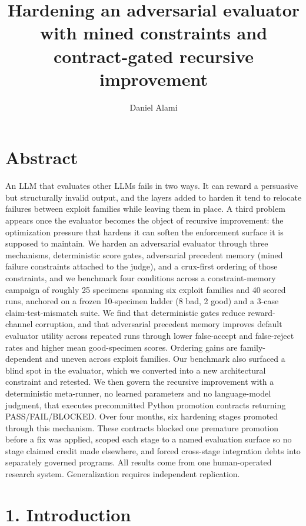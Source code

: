 \documentclass[
  11pt]{article}
\title{Hardening an adversarial evaluator with mined constraints and
contract-gated recursive improvement}
\author{Daniel Alami}
\date{}
\begin{document}
\maketitle

\section{Abstract}\label{abstract}

An LLM that evaluates other LLMs fails in two ways. It can reward a
persuasive but structurally invalid output, and the layers added to
harden it tend to relocate failures between exploit families while
leaving them in place. A third problem appears once the evaluator
becomes the object of recursive improvement: the optimization pressure
that hardens it can soften the enforcement surface it is supposed to
maintain. We harden an adversarial evaluator through three mechanisms,
deterministic score gates, adversarial precedent memory (mined failure
constraints attached to the judge), and a crux-first ordering of those
constraints, and we benchmark four conditions across a constraint-memory
campaign of roughly 25 specimens spanning six exploit families and 40
scored runs, anchored on a frozen 10-specimen ladder (8 bad, 2 good) and
a 3-case claim-test-mismatch suite. We find that deterministic gates
reduce reward-channel corruption, and that adversarial precedent memory
improves default evaluator utility across repeated runs through lower
false-accept and false-reject rates and higher mean good-specimen
scores. Ordering gains are family-dependent and uneven across exploit
families. Our benchmark also surfaced a blind spot in the evaluator,
which we converted into a new architectural constraint and retested. We
then govern the recursive improvement with a deterministic meta-runner,
no learned parameters and no language-model judgment, that executes
precommitted Python promotion contracts returning PASS/FAIL/BLOCKED.
Over four months, six hardening stages promoted through this mechanism.
These contracts blocked one premature promotion before a fix was
applied, scoped each stage to a named evaluation surface so no stage
claimed credit made elsewhere, and forced cross-stage integration debts
into separately governed programs. All results come from one
human-operated research system. Generalization requires independent
replication.

\section{1. Introduction}\label{introduction}
\end{document}
